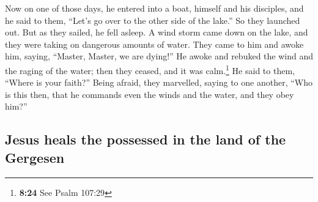  Now on one of those days, he entered into a boat,
himself and his disciples, and he said to them, ``Let's go over to the
other side of the lake.'' So they launched out.  But as
they sailed, he fell asleep. A wind storm came down on the lake, and
they were taking on dangerous amounts of water.  They
came to him and awoke him, saying, ``Master, Master, we are dying!'' He
awoke and rebuked the wind and the raging of the water; then they
ceased, and it was calm.\footnote{\textbf{8:24} See Psalm 107:29}
 He said to them, ``Where is your faith?'' Being afraid,
they marvelled, saying to one another, ``Who is this then, that he
commands even the winds and the water, and they obey him?''

\hypertarget{jesus-heals-the-possessed-in-the-land-of-the-gergesen}{%
\subsection{Jesus heals the possessed in the land of the
Gergesen}\label{jesus-heals-the-possessed-in-the-land-of-the-gergesen}}

